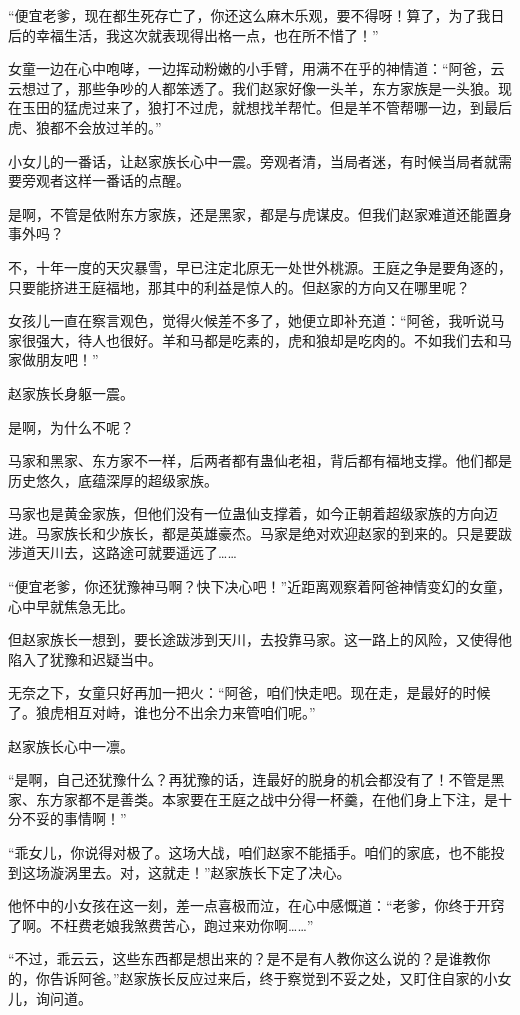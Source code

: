 \begin{this_body}
“便宜老爹，现在都生死存亡了，你还这么麻木乐观，要不得呀！算了，为了我日后的幸福生活，我这次就表现得出格一点，也在所不惜了！”

女童一边在心中咆哮，一边挥动粉嫩的小手臂，用满不在乎的神情道：“阿爸，云云想过了，那些争吵的人都笨透了。我们赵家好像一头羊，东方家族是一头狼。现在玉田的猛虎过来了，狼打不过虎，就想找羊帮忙。但是羊不管帮哪一边，到最后虎、狼都不会放过羊的。”

小女儿的一番话，让赵家族长心中一震。旁观者清，当局者迷，有时候当局者就需要旁观者这样一番话的点醒。

是啊，不管是依附东方家族，还是黑家，都是与虎谋皮。但我们赵家难道还能置身事外吗？

不，十年一度的天灾暴雪，早已注定北原无一处世外桃源。王庭之争是要角逐的，只要能挤进王庭福地，那其中的利益是惊人的。但赵家的方向又在哪里呢？

女孩儿一直在察言观色，觉得火候差不多了，她便立即补充道：“阿爸，我听说马家很强大，待人也很好。羊和马都是吃素的，虎和狼却是吃肉的。不如我们去和马家做朋友吧！”

赵家族长身躯一震。

是啊，为什么不呢？

马家和黑家、东方家不一样，后两者都有蛊仙老祖，背后都有福地支撑。他们都是历史悠久，底蕴深厚的超级家族。

马家也是黄金家族，但他们没有一位蛊仙支撑着，如今正朝着超级家族的方向迈进。马家族长和少族长，都是英雄豪杰。马家是绝对欢迎赵家的到来的。只是要跋涉道天川去，这路途可就要遥远了……

“便宜老爹，你还犹豫神马啊？快下决心吧！”近距离观察着阿爸神情变幻的女童，心中早就焦急无比。

但赵家族长一想到，要长途跋涉到天川，去投靠马家。这一路上的风险，又使得他陷入了犹豫和迟疑当中。

无奈之下，女童只好再加一把火：“阿爸，咱们快走吧。现在走，是最好的时候了。狼虎相互对峙，谁也分不出余力来管咱们呢。”

赵家族长心中一凛。

“是啊，自己还犹豫什么？再犹豫的话，连最好的脱身的机会都没有了！不管是黑家、东方家都不是善类。本家要在王庭之战中分得一杯羹，在他们身上下注，是十分不妥的事情啊！”

“乖女儿，你说得对极了。这场大战，咱们赵家不能插手。咱们的家底，也不能投到这场漩涡里去。对，这就走！”赵家族长下定了决心。

他怀中的小女孩在这一刻，差一点喜极而泣，在心中感慨道：“老爹，你终于开窍了啊。不枉费老娘我煞费苦心，跑过来劝你啊……”

“不过，乖云云，这些东西都是想出来的？是不是有人教你这么说的？是谁教你的，你告诉阿爸。”赵家族长反应过来后，终于察觉到不妥之处，又盯住自家的小女儿，询问道。


\end{this_body}
